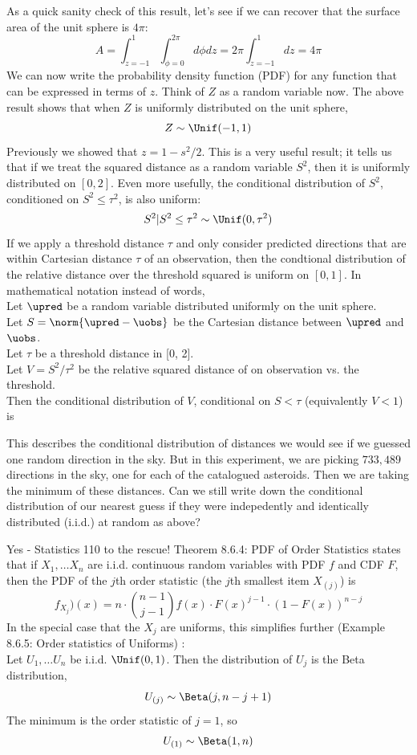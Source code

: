 As a quick sanity check of this result, let's see if we can recover that the surface area of  the unit sphere is $4 \pi$:
$$ A = \int_{z = -1}^{1} \int_{\phi=0}^{2 \pi} d \phi dz = 2 \pi \int_{z = -1}^{1} dz = 4 \pi$$
We can now write the probability density function (PDF) for any function that can be expressed in terms of $z$.
Think of $Z$ as a random variable now.  The above result shows that when $Z$ is uniformly distributed on the unit sphere,
$$Z \sim \Unif(-1, 1)$$
Previously we showed that $z = 1 - s^2 / 2$.
This is a very useful result; it tells us that if we treat the squared distance as a random variable $S^2$, then it is uniformly distributed on $[0, 2]$.
Even more usefully, the conditional distribution of $S^2$, conditioned on $S^2 \le \tau^2$, is also uniform:
$$ S^2 | S^2 \le \tau^2 \sim \Unif(0, \tau^2)$$
If we apply a threshold distance $\tau$ and only consider predicted directions that are within Cartesian distance $\tau$ of an observation,
then the condtional distribution of the relative distance over the threshold squared is uniform on $[0, 1]$.
In mathematical notation instead of words, \\ 
Let $\upred$ be a random variable distributed uniformly on the unit sphere.\\
Let $S = \norm{\upred - \uobs}$ be the Cartesian distance between $\upred$ and $\uobs$. \\
Let $\tau$ be a threshold distance in [0, 2].\\
Let $V = S^2 / \tau^2$ be the relative squared distance of on observation vs. the threshold.\\
Then the conditional distribution of $V$, conditional on $S < \tau$ (equivalently $V < 1$) is

This describes the conditional distribution of distances we would see if we guessed one random direction in the sky.
But in this experiment, we are picking $733,489$ directions in the sky, one for each of the catalogued asteroids.
Then we are taking the minimum of these distances.
Can we still write down the conditional distribution of our nearest guess 
if they were indepedently and identically distributed (i.i.d.) at random as above?

Yes - Statistics 110 to the rescue!
Theorem 8.6.4: PDF of Order Statistics \cite{BH} states that if $X_1, \ldots X_n$ are i.i.d. continuous random variables
with PDF $f$ and CDF $F$, then the PDF of the $j$th order statistic (the $j$th smallest item $X_{(j)}$) is
$$f_{X_{j}})(x) = n \cdot {{n-1}\choose{j-1}} f(x) \cdot F(x)^{j-1} \cdot (1 - F(x))^{n-j}$$
In the special case that the $X_j$ are uniforms, this simplifies further (Example 8.6.5: Order statistics of Uniforms) \cite{BH}:\\
Let $U_1, \ldots U_n$ be i.i.d. $\Unif(0,1)$.
Then the distribution of $U_{j}$ is the Beta distribution,
$$U_{(j)} \sim \Beta(j, n-j+1)$$
The minimum is the order statistic of $j=1$, so
$$U_{(1)} \sim \Beta(1, n)$$ 

